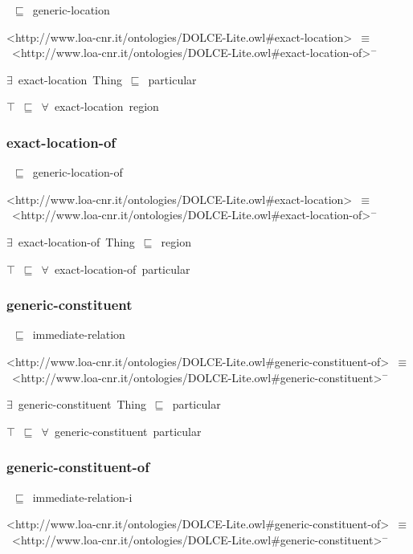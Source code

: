 \documentclass{article}
\begin{document}
~\ensuremath{\sqsubseteq}~generic-location

<http://www.loa-cnr.it/ontologies/DOLCE-Lite.owl#exact-location>~\ensuremath{\equiv}~<http://www.loa-cnr.it/ontologies/DOLCE-Lite.owl#exact-location-of>\ensuremath{^-}

\ensuremath{\exists}~exact-location~Thing~\ensuremath{\sqsubseteq}~particular

\ensuremath{\top}~\ensuremath{\sqsubseteq}~\ensuremath{\forall}~exact-location~region

\subsubsection*{exact-location-of}

~\ensuremath{\sqsubseteq}~generic-location-of

<http://www.loa-cnr.it/ontologies/DOLCE-Lite.owl#exact-location>~\ensuremath{\equiv}~<http://www.loa-cnr.it/ontologies/DOLCE-Lite.owl#exact-location-of>\ensuremath{^-}

\ensuremath{\exists}~exact-location-of~Thing~\ensuremath{\sqsubseteq}~region

\ensuremath{\top}~\ensuremath{\sqsubseteq}~\ensuremath{\forall}~exact-location-of~particular

\subsubsection*{generic-constituent}

~\ensuremath{\sqsubseteq}~immediate-relation

<http://www.loa-cnr.it/ontologies/DOLCE-Lite.owl#generic-constituent-of>~\ensuremath{\equiv}~<http://www.loa-cnr.it/ontologies/DOLCE-Lite.owl#generic-constituent>\ensuremath{^-}

\ensuremath{\exists}~generic-constituent~Thing~\ensuremath{\sqsubseteq}~particular

\ensuremath{\top}~\ensuremath{\sqsubseteq}~\ensuremath{\forall}~generic-constituent~particular

\subsubsection*{generic-constituent-of}

~\ensuremath{\sqsubseteq}~immediate-relation-i

<http://www.loa-cnr.it/ontologies/DOLCE-Lite.owl#generic-constituent-of>~\ensuremath{\equiv}~<http://www.loa-cnr.it/ontologies/DOLCE-Lite.owl#generic-constituent>\ensuremath{^-}
\end{document}

